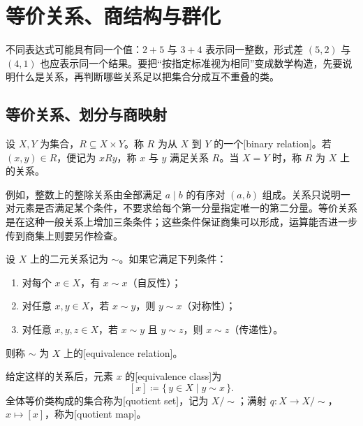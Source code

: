 
\section{等价关系、商结构与群化}
\label{b1:sec:0103}

%
%

不同表达式可能具有同一个值：\(2+5\) 与 \(3+4\) 表示同一整数，形式差 \((5,2)\) 与 \((4,1)\) 也应表示同一个结果。要把“按指定标准视为相同”变成数学构造，先要说明什么是关系，再判断哪些关系足以把集合分成互不重叠的类。

\subsection{等价关系、划分与商映射}
\label{b1:subsec:0103:01}

\begin{definition}\label{b1:def:binary-relation}
	设 \(X,Y\) 为集合，\(R\subseteq X\times Y\)。称 \(R\) 为从 \(X\) 到 \(Y\) 的一个[binary relation]。若 \((x,y)\in R\)，便记为 \(xRy\)，称 \(x\) 与 \(y\) 满足关系 \(R\)。当 \(X=Y\) 时，称 \(R\) 为 \(X\) 上的关系。
\end{definition}

例如，整数上的整除关系由全部满足 \(a\mid b\) 的有序对 \((a,b)\) 组成。关系只说明一对元素是否满足某个条件，不要求给每个第一分量指定唯一的第二分量。等价关系是在这种一般关系上增加三条条件；这些条件保证商集可以形成，运算能否进一步传到商集上则要另作检查。

\begin{definition}\label{b1:def:equivalence}
	设 \(X\) 上的二元关系记为 \(\sim\)。如果它满足下列条件：
	\begin{enumerate}
		\item 对每个 \(x\in X\)，有 \(x\sim x\)（自反性）；
		\item 对任意 \(x,y\in X\)，若 \(x\sim y\)，则 \(y\sim x\)（对称性）；
		\item 对任意 \(x,y,z\in X\)，若 \(x\sim y\) 且 \(y\sim z\)，则 \(x\sim z\)（传递性）。
	\end{enumerate}
	则称 \(\sim\) 为 \(X\) 上的[equivalence relation]。

	给定这样的关系后，元素 \(x\) 的[equivalence class]为
	\[
		[x]\coloneqq\{\,y\in X\mid y\sim x\,\}.
	\]
	全体等价类构成的集合称为[quotient set]，记为 \(X/{\sim}\)；满射 \(q:X\rightarrow X/{\sim}\)，\(x\mapsto[x]\)，称为[quotient map]。
\end{definition}


